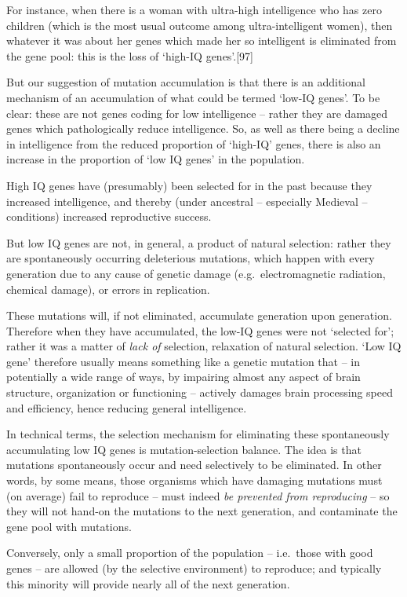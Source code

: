 \documentclass[
]{book}
\begin{document}
For instance, when there is a woman with ultra-high intelligence who has zero children (which is the most usual outcome among ultra-intelligent women), then whatever it was about her genes which made her so intelligent is eliminated from the gene pool: this is the loss of `high-IQ genes'.{[}97{]}

But our suggestion of mutation accumulation is that there is an additional mechanism of an accumulation of what could be termed `low-IQ genes'. To be clear: these are not genes coding for low intelligence -- rather they are damaged genes which pathologically reduce intelligence. So, as well as there being a decline in intelligence from the reduced proportion of `high-IQ' genes, there is also an increase in the proportion of `low IQ genes' in the population.

High IQ genes have (presumably) been selected for in the past because they increased intelligence, and thereby (under ancestral -- especially Medieval -- conditions) increased reproductive success.

But low IQ genes are not, in general, a product of natural selection: rather they are spontaneously occurring deleterious mutations, which happen with every generation due to any cause of genetic damage (e.g.~electromagnetic radiation, chemical damage), or errors in replication.

These mutations will, if not eliminated, accumulate generation upon generation. Therefore when they have accumulated, the low-IQ genes were not `selected for'; rather it was a matter of \emph{lack of} selection, relaxation of natural selection. `Low IQ gene' therefore usually means something like a genetic mutation that -- in potentially a wide range of ways, by impairing almost any aspect of brain structure, organization or functioning -- actively damages brain processing speed and efficiency, hence reducing general intelligence.

In technical terms, the selection mechanism for eliminating these spontaneously accumulating low IQ genes is mutation-selection balance. The idea is that mutations spontaneously occur and need selectively to be eliminated. In other words, by some means, those organisms which have damaging mutations must (on average) fail to reproduce -- must indeed \emph{be prevented from reproducing} -- so they will not hand-on the mutations to the next generation, and contaminate the gene pool with mutations.

Conversely, only a small proportion of the population -- i.e.~those with good genes -- are allowed (by the selective environment) to reproduce; and typically this minority will provide nearly all of the next generation.
\end{document}
